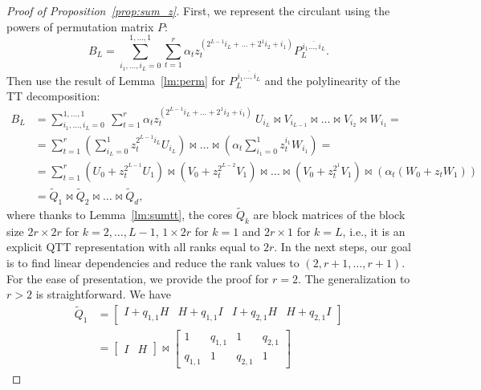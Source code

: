 \documentclass[a4paper]{article}
\newcommand{\perm}{P}
\newcommand{\LL}{L}
\newcommand{\invA}{B}
\begin{document}
\begin{proof}[Proof of Proposition~\ref{prop:sum_z}]
First, we represent the circulant using the powers of permutation matrix $\perm$:
\[
    \invA_\LL = \sum_{i_1,\dots,i_\LL=0}^{1,\dots,1} \sum_{t=1}^r \alpha_t z_t^{\left(2^{\LL-1}i_{\LL} + \dots + 2^1 i_2 + i_1\right)} \perm_\LL^{\,\overline{i_1\dots, i_\LL}}.
\]
Then use the result of Lemma~\ref{lm:perm} for $\perm_\LL^{\,\overline{i_1\dots, i_\LL}}$ and the polylinearity of the TT decomposition:
\[
\begin{split}
    \invA_\LL 
    &= \sum_{i_1,\dots,i_\LL=0}^{1,\dots,1}\ \sum_{t=1}^r
    \alpha_t
    z_t^{\left(2^{\LL-1}i_{\LL} + \dots + 2^1 i_2 + i_1\right)} \ U_{i_\LL} \Join V_{i_{\LL-1}} \Join \dots \Join V_{i_{2}} \Join W_{i_1}  
    = \\
    &=
    \sum_{t=1}^r \left( \sum_{i_\LL=0}^1 z_t^{2^{\LL-1}i_{\LL}} U_{i_\LL}  \right)
    \Join 
    \dots
    \Join 
    \left( \alpha_t \sum_{i_1=0}^1 z_t^{i_{1}} W_{i_1} \right) = \\
    &=
    \sum_{t=1}^r \left(U_0 + z_t^{2^{\LL-1}} U_1 \right) \Join \left(V_0 + z_t^{2^{\LL-2}} V_1 \right) \Join \dots \Join \left(V_0 + z_t^{2^{1}} V_1 \right) \Join \left(\alpha_t \left(W_0 + z_t W_1 \right) \right) \\
    &=
    {\widetilde Q}_1 \Join {\widetilde Q}_2 \Join \dots \Join {\widetilde Q}_d,
\end{split}
\]
where thanks to Lemma~\ref{lm:sumtt}, the cores ${\widetilde Q}_k$ are block matrices of the block size $2r \times 2r$ for $k=2,\dots,\LL-1$, $1\times 2r$ for $k=1$ and $2r\times 1$ for $k=\LL$, i.e., it is an explicit QTT representation with all ranks equal to $2r$.
In the next steps, our goal is to find linear dependencies and reduce the rank values to $(2, r+1, \dots, r+1)$.
For the ease of presentation, we provide the proof for $r=2$. The generalization to $r>2$ is straightforward.
We have
\[
\begin{split}
    {\widetilde Q}_1
    &= 
    \begin{bmatrix}
        I + q_{1,1} H & H + q_{1,1} I & I + q_{2,1} H & H + q_{2,1} I
    \end{bmatrix}
    \\
    &= 
    \begin{bmatrix}
        I & H
    \end{bmatrix}
    \Join
    \begin{bmatrix}
        1 & q_{1,1} & 1 & q_{2,1} \\
        q_{1,1} & 1 & q_{2,1} & 1

\end{bmatrix}
\end{split}\]
\end{proof}
\end{document}
